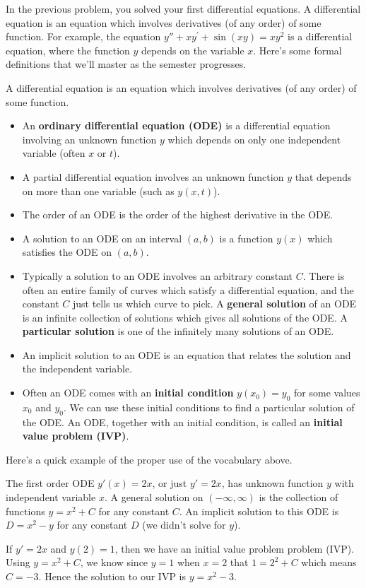 In the previous problem, you solved your first differential equations. 
A differential equation is an equation which involves derivatives (of any order) of some function.  For example, the equation $y''+xy^\prime+\sin(xy)=xy^2$ is a differential equation, where the function $y$ depends on the variable $x$. Here's some formal definitions that we'll master as the semester progresses.


\begin{definition}
A differential equation is an equation which involves derivatives (of any order) of some function.
\begin{itemize}
 \item An \textbf{ordinary differential equation (ODE)} is a differential equation involving an unknown function $y$ which depends on only one independent variable (often $x$ or $t$). 
 \item A partial differential equation involves an unknown function $y$ that depends on more than one variable (such as $y(x,t)$). 
 \item The order of an ODE is the order of the highest derivative in the ODE. 
 \item A solution to an ODE on an interval $(a,b)$ is a function $y(x)$ which satisfies the ODE on $(a,b)$. 
 \item Typically a solution to an ODE involves an arbitrary constant $C$. There is often an entire family of curves which satisfy a differential equation, and the constant $C$ just tells us which curve to pick. A \textbf{general solution} of an ODE is an infinite collection of solutions which gives all solutions of the ODE. A \textbf{particular solution} is one of the infinitely many solutions of an ODE. 
 \item An implicit solution to an ODE is an equation that relates the solution and the independent variable.
 \item Often an ODE comes with an \textbf{initial condition} $y(x_0)=y_0$ for some values $x_0$ and $y_0$. We can use these initial conditions to find a particular solution of the ODE. An ODE, together with an initial condition, is called an \textbf{initial value problem (IVP)}.  
\end{itemize}
\end{definition}



Here's a quick example of the proper use of the vocabulary above.



\begin{example}
The first order ODE $y'(x) = 2x$, or just $y'=2x$, has unknown function $y$ with independent variable $x$. A general solution on $(-\infty,\infty)$ is the collection of functions $y=x^2+C$ for any constant $C$. An implicit solution to this ODE is $D=x^2-y$ for any constant $D$ (we didn't solve for $y$). 

If $y'=2x$ and $y(2)=1$, then we have an initial value problem problem (IVP). Using $y=x^2+C$, we know since $y=1$ when $x=2$ that $1=2^2+C$ which means $C=-3$. Hence the solution to our IVP is $y=x^2-3$.
\end{example}



